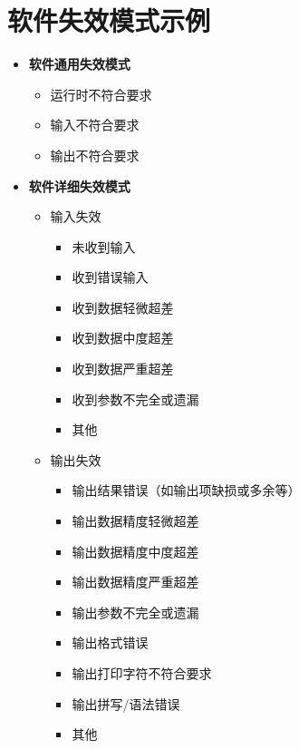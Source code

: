\section*{软件失效模式示例}

\begin{multicols}{2}
\begin{itemize}
    \item \textbf{软件通用失效模式}
    \begin{itemize}
        \item 运行时不符合要求
        \item 输入不符合要求
        \item 输出不符合要求
    \end{itemize}

    \item \textbf{软件详细失效模式}
    \begin{itemize}
        \item 输入失效
        \begin{itemize}
            \item 未收到输入
            \item 收到错误输入
            \item 收到数据轻微超差
            \item 收到数据中度超差
            \item 收到数据严重超差
            \item 收到参数不完全或遗漏
            \item 其他
        \end{itemize}

        \item 输出失效
        \begin{itemize}
            \item 输出结果错误（如输出项缺损或多余等）
            \item 输出数据精度轻微超差
            \item 输出数据精度中度超差
            \item 输出数据精度严重超差
            \item 输出参数不完全或遗漏
            \item 输出格式错误
            \item 输出打印字符不符合要求
            \item 输出拼写/语法错误
            \item 其他
        \end{itemize}


\end{itemize}
\end{itemize}
\end{multicols}
